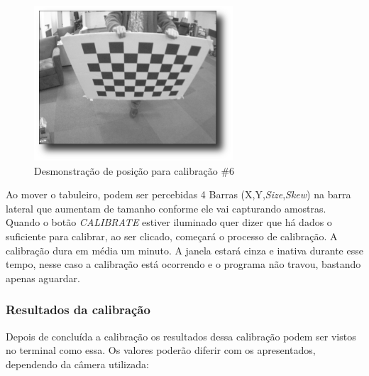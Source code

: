 \begin{figure}[!htb]
  \includegraphics[width=\linewidth]{Imagens/figura3-19.png}
  \caption{Desmonstração de posição para calibração \#6}\label{fig3:19}
\endminipage
\end{figure}

Ao mover o tabuleiro, podem ser percebidas 4 Barras (X,Y,\textit{Size},\textit{Skew}) na barra lateral que aumentam de tamanho conforme ele vai capturando amostras. Quando o botão \textit{CALIBRATE} estiver iluminado quer dizer que há dados o suficiente para calibrar, ao ser clicado, começará o processo de calibração.
A calibração dura em média um minuto. A janela estará cinza e inativa durante esse tempo, nesse caso a calibração está ocorrendo e o programa não travou, bastando apenas aguardar.

\subsubsection{Resultados da calibração}

Depois de concluída a calibração os resultados dessa calibração podem ser vistos no terminal como essa. Os valores poderão diferir com os apresentados, dependendo da câmera utilizada:


